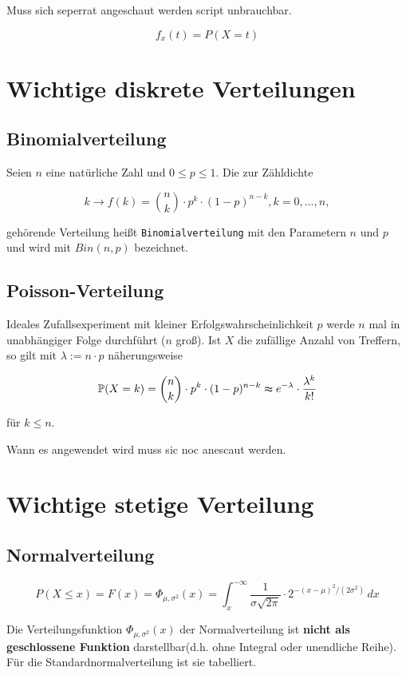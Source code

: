 Muss sich seperrat angeschaut werden script unbrauchbar.

\[f_x(t)=P(X=t)\]

\section{Wichtige diskrete Verteilungen}

\subsection{Binomialverteilung}

Seien $n$ eine natürliche Zahl und $0\leq p\leq 1$. Die zur Zähldichte

\[k\longrightarrow f(k)=\binom{n}{k}\cdot p^k\cdot (1-p)^{n-k},k=0,...,n, \]

gehörende Verteilung heißt \texttt{Binomialverteilung} mit den Parametern $n$ und $p$ und wird mit $Bin(n,p)$ bezeichnet.

\subsection{Poisson-Verteilung}

Ideales Zufallsexperiment mit kleiner Erfolgswahrscheinlichkeit $p$ werde $n$ mal in unabhängiger Folge durchführt ($n$ groß). Ist $X$ die zufällige Anzahl von Treffern, so gilt mit $\lambda := n\cdot p$ näherungsweise

\[\mathbb{P} (X=k) = \binom{n}{k}\cdot p^k \cdot (1-p)^{n-k}\thickapprox e^{-\lambda}\cdot \frac{\lambda^k}{k!}  \]

für $k\leq n$.

Wann es angewendet wird muss sic noc anescaut werden.

\section{Wichtige stetige Verteilung}

\subsection{Normalverteilung}

\[P(X\leq x)= F(x)=\Phi_{\mu ,\sigma ^2}(x)=\int_{x}^{-\infty} \frac{1}{\sigma\sqrt{2\pi}}\cdot 2^{-(x-\mu)^2/(2\sigma^2)} \,dx \]

Die Verteilungsfunktion $\Phi_{\mu ,\sigma ^2}(x)$ der Normalverteilung ist \textbf{nicht als geschlossene Funktion} darstellbar(d.h. ohne Integral oder unendliche Reihe). Für die Standardnormalverteilung ist sie tabelliert.

